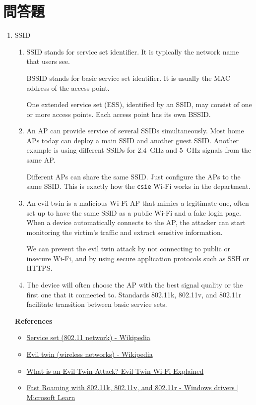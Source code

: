 \documentclass[12pt, a4paper]{article}
\begin{document}
  \section{問答題}
  \begin{enumerate}[label=(\alph*)]
    \item SSID
    \begin{enumerate}[label=(\arabic*)]
      \item SSID stands for service set identifier. It is typically the network name that
      users see.

      BSSID stands for basic service set identifier. It is usually the MAC address of the
      access point.

      One extended service set (ESS), identified by an SSID, may consist of one or
      more access points. Each access point has its own BSSID.

      \item An AP can provide service of several SSIDs simultaneously. Most home APs today
      can deploy a main SSID and another guest SSID. Another example is using different SSIDs
      for 2.4~GHz and 5~GHz signals from the same AP.

      Different APs can share the same SSID. Just configure the APs to the same SSID. This is
      exactly how the \verb|csie| Wi-Fi works in the department.

      \item An evil twin is a malicious Wi-Fi AP that mimics a legitimate one, often
      set up to have the same SSID as a public Wi-Fi and a fake login page. When a device
      automatically connects to the AP, the attacker can start monitoring the victim's
      traffic and extract sensitive information.

      We can prevent the evil twin attack by not connecting to public or insecure
      Wi-Fi, and by using secure application protocols such as SSH or HTTPS.

      \item The device will often choose the AP with the best signal quality or the first
      one that it connected to. Standards 802.11k, 802.11v, and 802.11r facilitate transition
      between basic service sets.
    \end{enumerate}
    \textbf{References}
    \begin{itemize}
      \item \href{https://en.wikipedia.org/wiki/Service_set_(802.11_network)}{Service set (802.11 network) - Wikipedia}
      \item \href{https://en.wikipedia.org/wiki/Evil_twin_(wireless_networks)}{Evil twin (wireless networks) - Wikipedia}
      \item \href{https://usa.kaspersky.com/resource-center/preemptive-safety/evil-twin-attacks}{What is an Evil Twin Attack? Evil Twin Wi-Fi Explained}
      \item \href{https://learn.microsoft.com/en-us/windows-hardware/drivers/network/fast-roaming-with-802-11k--802-11v--and-802-11r}{Fast Roaming with 802.11k, 802.11v, and 802.11r - Windows drivers | Microsoft Learn}
    \end{itemize}


\end{enumerate}
\end{document}
